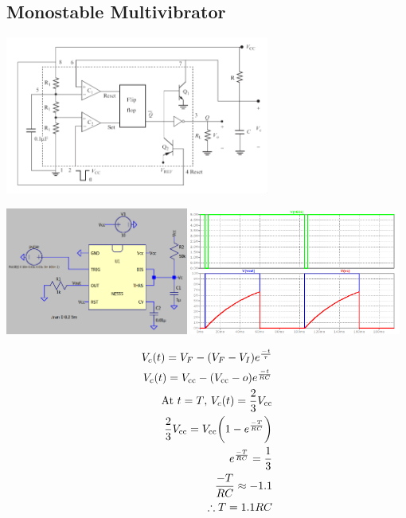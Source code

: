 \documentclass[a4paper, 12pt]{report}
\begin{document}
\begin{center}
\begin{center}
\begin{center}
\begin{center}
\begin{center}
\begin{center}
\begin{center}
\begin{center}
\begin{center}
\begin{center}
\begin{center}
\begin{center}
\section{Monostable Multivibrator}
\begin{center}
    \includegraphics[width=0.65\textwidth]{figures/timermono.png}
\end{center}
\begin{center}
    \includegraphics[width=0.45\textwidth]{figures/31c.png}
    \includegraphics[width=0.52\textwidth]{figures/31w.png}\\
\end{center}
\begin{equation}\notag
        \begin{align}
            V_c(t) = V_F - (V_F - V_I)e^{\frac{-t}{\tau}}\\
            V_c(t) = V_\text{cc} - (V_\text{cc} - o)e^{\frac{-t}{RC}}\\
            \text{At\ } t = T \text{,\ } V_c(t) = \frac{2}{3}V_\text{cc}\\
            \frac{2}{3}V_\text{cc} = V_\text{cc}\bigg(1-e^{\frac{-T}{RC}}\bigg)\\
            e^{\frac{-T}{RC}} = \frac{1}{3}\\
            \frac{-T}{RC} \approx -1.1\\
            \therefore T = 1.1RC
        \end{align}
    \end{equation}

\end{center}
\end{center}
\end{center}
\end{center}
\end{center}
\end{center}
\end{center}
\end{center}
\end{center}
\end{center}
\end{center}
\end{center}
\end{document}
